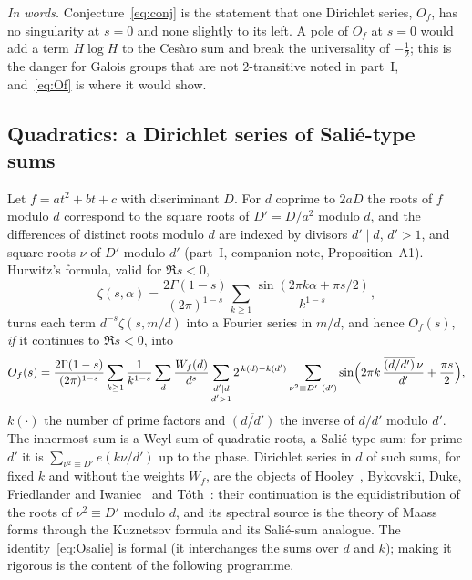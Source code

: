 \documentclass[11pt,a4paper]{article}
\theoremstyle{remark}\newtheorem{remark}[theorem]{Remark}
\begin{document}
\emph{In words.} Conjecture~\eqref{eq:conj} is the statement that one Dirichlet series, $O_f$, has no
singularity at $s=0$ and none slightly to its left. A pole of $O_f$ at $s=0$ would add a term $H\log H$ to
the Ces\`aro sum and break the universality of $-\tfrac12$; this is the danger for Galois groups that are
not $2$-transitive noted in part~I, and~\eqref{eq:Of} is where it would show.

\subsection{Quadratics: a Dirichlet series of Sali\'e-type sums}

Let $f=at^2+bt+c$ with discriminant $D$. For $d$ coprime to $2aD$ the roots of $f$ modulo $d$ correspond to
the square roots of $D'=D/a^2$ modulo $d$, and the differences of distinct roots modulo $d$ are indexed by
divisors $d'\mid d$, $d'>1$, and square roots $\nu$ of $D'$ modulo $d'$ (part~I, companion note,
Proposition~A1). Hurwitz's formula, valid for $\Re s<0$,
\[
\zeta(s,\alpha)=\frac{2\Gamma(1-s)}{(2\pi)^{1-s}}\sum_{k\ge1}\frac{\sin(2\pi k\alpha+\pi s/2)}{k^{1-s}},
\]
turns each term $d^{-s}\zeta(s,m/d)$ into a Fourier series in $m/d$, and hence $O_f(s)$, \emph{if} it continues
to $\Re s<0$, into
\begin{equation}\label{eq:Osalie}
O_f(s)=\frac{2\Gamma(1-s)}{(2\pi)^{1-s}}\sum_{k\ge1}\frac1{k^{1-s}}\sum_{d}\frac{W_f(d)}{d^{s}}\sum_{\substack{d'\mid d\\ d'>1}}2^{\,k(d)-k(d')}
\sum_{\nu^2\equiv D'\ (d')}\sin\Bigl(2\pi k\,\frac{\overline{(d/d')}\,\nu}{d'}+\frac{\pi s}2\Bigr),
\end{equation}
$k(\cdot)$ the number of prime factors and $\overline{(d/d')}$ the inverse of $d/d'$ modulo $d'$. The innermost
sum is a Weyl sum of quadratic roots, a Sali\'e-type sum: for prime $d'$ it is
$\sum_{\nu^2\equiv D'}e(k\nu/d')$ up to the phase. Dirichlet series in $d$ of such sums, for fixed $k$ and
without the weights $W_f$, are the objects of Hooley~\cite{Hooley1963}, Bykovskii, Duke, Friedlander and
Iwaniec~\cite{DFI1995,DFI2012} and T\'oth~\cite{Toth2000}: their continuation is the equidistribution of the
roots of $\nu^2\equiv D'$ modulo $d$, and its spectral source is the theory of Maass forms through the
Kuznetsov formula and its Sali\'e-sum analogue. The identity~\eqref{eq:Osalie} is formal (it interchanges
the sums over $d$ and $k$); making it rigorous is the content of the following programme.
\end{document}
